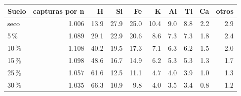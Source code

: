 \begin{tabular}{lrrrrrrrrr}
\toprule
Suelo & capturas por n & H & Si & Fe & K & Al & Ti & Ca & otros \\
\midrule
seco & 1.006 & 13.9 & 27.9 & 25.0 & 10.4 & 9.0 & 8.8 & 2.2 & 2.9 \\
5\,\% & 1.089 & 29.1 & 22.9 & 20.6 & 8.6 & 7.3 & 7.3 & 1.8 & 2.4 \\
10\,\% & 1.108 & 40.2 & 19.5 & 17.3 & 7.1 & 6.3 & 6.2 & 1.5 & 2.0 \\
15\,\% & 1.098 & 48.6 & 16.7 & 14.9 & 6.2 & 5.3 & 5.3 & 1.3 & 1.7 \\
25\,\% & 1.057 & 61.6 & 12.5 & 11.1 & 4.7 & 4.0 & 3.9 & 1.0 & 1.3 \\
30\,\% & 1.035 & 66.3 & 10.9 & 9.8 & 4.0 & 3.5 & 3.4 & 0.8 & 1.2 \\
\bottomrule
\end{tabular}
